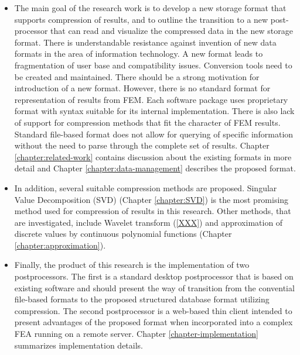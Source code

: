 \begin{itemize}
    \item The main goal of the research work is to develop a new storage format that supports compression of results, and to outline the transition to a new post-processor that can read and visualize the compressed data in the new storage format. There is understandable resistance against invention of new data formats in the area of information technology. A new format leads to fragmentation of user base and compatibility issues. Conversion tools need to be created and maintained. There should be a strong motivation for introduction of a new format. However, there is no standard format for representation of results from FEM. Each software package uses proprietary format with syntax suitable for its internal implementation. There is also lack of support for compression methods that fit the character of FEM results. Standard file-based format does not allow for querying of specific information without the need to parse through the complete set of results. Chapter \ref{chapter:related-work} contains discussion about the existing formats in more detail and Chapter \ref{chapter:data-management} describes the proposed format.
    \item In addition, several suitable compression methods are proposed. Singular Value Decomposition (SVD) (Chapter \ref{chapter:SVD}) is the most promising method used for compression of results in this research. Other methods, that are investigated, include Wavelet transform (\ref{XXX}) and approximation of discrete values by continuous polynomial functions (Chapter \ref{chapter:approximation}).
    \item Finally, the product of this research is the implementation of two postprocessors. The first is a standard desktop postprocessor that is based on existing software and should present the way of transition from the convential file-based formats to the proposed structured database format utilizing compression. The second postprocessor is a web-based thin client intended to present advantages of the proposed format when incorporated into a complex FEA running on a remote server. Chapter \ref{chapter-implementation} summarizes implementation details.
\end{itemize}



